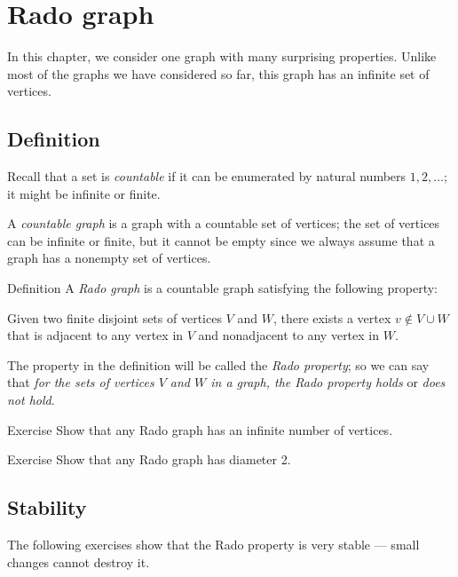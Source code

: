 \chapter{Rado graph}

In this chapter, we consider one graph with many surprising properties.
Unlike most of the graphs we have considered so far, this graph has an infinite set of vertices.

\section{Definition}

Recall that a set is \emph{countable} if it can be enumerated by natural numbers $1,2,\dots$;
it might be infinite or finite.

A \emph{countable graph} is a graph with a countable set of vertices;
the set of vertices can be infinite or finite, but it cannot be empty since we always assume that a graph has a nonempty set of vertices.


\begin{thm}{Definition}
A \emph{Rado graph} is a countable graph satisfying the following property:

Given two finite disjoint sets of vertices $V$ and $W$, there exists a
vertex $v\notin V\cup W$ that is adjacent to any vertex in $V$ and nonadjacent to any vertex in $W$.
\end{thm}

The property in the definition will be called the \emph{Rado property}; so we can say that \textit{for the sets of vertices $V$ and $W$ in a graph, the Rado property holds} or \textit{does not hold}.

\begin{thm}{Exercise}\label{ex:rado-infty}
Show that any Rado graph has an infinite number of vertices. 
\end{thm}

\begin{thm}{Exercise}\label{ex:rado-diam}
Show that any Rado graph has diameter 2.
\end{thm}

\section{Stability}

The following exercises show that the Rado property is very stable --- 
small changes cannot destroy it.

